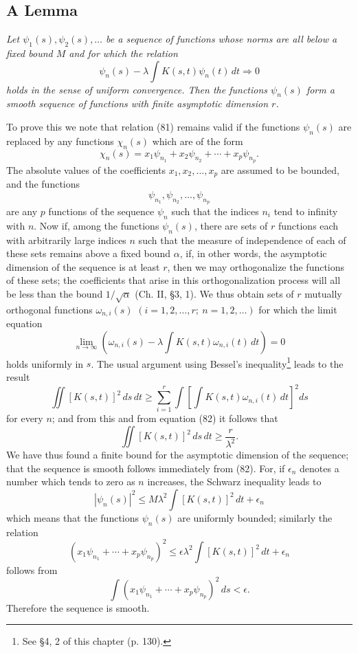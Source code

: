 \subsection{A Lemma}
\emph{Let $\psi_1(s),\psi_2(s),\ldots$ be a sequence of functions whose norms are all below a fixed bound $M$ and for which the relation}
\begin{equation}\tag{81}
\psi_n(s)-\lambda\int K(s,t)\psi_n(t)\,dt\Rightarrow0
\end{equation}
\emph{holds in the sense of uniform convergence. Then the functions $\psi_n(s)$ form a smooth sequence of functions with finite asymptotic dimension $r$.}

To prove this we note that relation (81) remains valid if the functions $\psi_n(s)$ are replaced by any functions $\chi_n(s)$ which are of the form
\[
\chi_n(s)=x_1\psi_{n_1}+x_2\psi_{n_2}+\cdots+x_p\psi_{n_p}.
\]
The absolute values of the coefficients $x_1,x_2,\ldots,x_p$ are assumed to be bounded, and the functions
\[
\psi_{n_1},\psi_{n_2},\ldots,\psi_{n_p}
\]
are any $p$ functions of the sequence $\psi_n$ such that the indices $n_i$ tend to infinity with $n$. Now if, among the functions $\psi_n(s)$, there are sets of $r$ functions each with arbitrarily large indices $n$ such that the measure of independence of each of these sets remains above a fixed bound $\alpha$, if, in other words, the asymptotic dimension of the sequence is at least $r$, then we may orthogonalize the functions of these sets; the coefficients that arise in this orthogonalization process will all be less than the bound $1/\sqrt{\alpha}$ (Ch. II, \S3, 1). We thus obtain sets of $r$ mutually orthogonal functions $\omega_{n,i}(s)$ $(i=1,2,\ldots,r;\ n=1,2,\ldots)$ for which the limit equation
\begin{equation}\tag{82}
\lim_{n\to\infty}\left(\omega_{n,i}(s)-\lambda\int K(s,t)\omega_{n,i}(t)\,dt\right)=0
\end{equation}
holds uniformly in $s$. The usual argument using Bessel's inequality\footnote{See \S4, 2 of this chapter (p. 130).} leads to the result
\[
\iint[K(s,t)]^2\,ds\,dt
\ge\sum_{i=1}^{r}\int\left[\int K(s,t)\omega_{n,i}(t)\,dt\right]^2ds
\]
for every $n$; and from this and from equation (82) it follows that
\[
\iint[K(s,t)]^2\,ds\,dt\ge\frac{r}{\lambda^2}.
\]
We have thus found a finite bound for the asymptotic dimension of the sequence; that the sequence is smooth follows immediately from (82). For, if $\epsilon_n$ denotes a number which tends to zero as $n$ increases, the Schwarz inequality leads to
\[
|\psi_n(s)|^2\le M\lambda^2\int[K(s,t)]^2\,dt+\epsilon_n
\]
which means that the functions $\psi_n(s)$ are uniformly bounded; similarly the relation
\[
(x_1\psi_{n_1}+\cdots+x_p\psi_{n_p})^2
\le\epsilon\lambda^2\int[K(s,t)]^2\,dt+\epsilon_n
\]
follows from
\[
\int(x_1\psi_{n_1}+\cdots+x_p\psi_{n_p})^2\,ds<\epsilon.
\]
Therefore the sequence is smooth.

